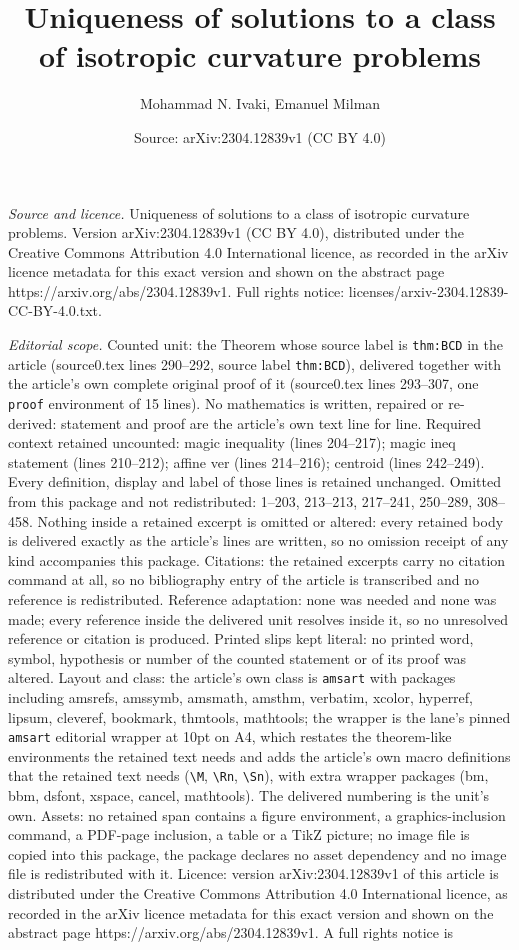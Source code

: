 \documentclass[10pt,a4paper]{amsart}
\title[Uniqueness of solutions to a class of isotropic curvature pr]{Uniqueness of solutions to a class of isotropic curvature problems}
\author{Mohammad N. Ivaki, Emanuel Milman}
\date{Source: arXiv:2304.12839v1 (CC BY 4.0)}
\begin{document}
\maketitle

\noindent\emph{Source and licence.} Uniqueness of solutions to a class of isotropic curvature problems. Version arXiv:2304.12839v1 (CC BY 4.0), distributed under the Creative Commons Attribution 4.0 International licence, as recorded in the arXiv licence metadata for this exact version and shown on the abstract page https://arxiv.org/abs/2304.12839v1. Full rights notice: licenses/arxiv-2304.12839-CC-BY-4.0.txt.\par\smallskip

\noindent\textit{Editorial scope.} Counted unit: the Theorem whose source label is \texttt{thm:BCD} in the article (source0.tex lines 290--292, source label \texttt{thm:BCD}), delivered together with the article's own complete original proof of it (source0.tex lines 293--307, one \texttt{proof} environment of 15 lines). No mathematics is written, repaired or re-derived: statement and proof are the article's own text line for line. Required context retained uncounted: magic inequality (lines 204--217); magic ineq statement (lines 210--212); affine ver (lines 214--216); centroid (lines 242--249). Every definition, display and label of those lines is retained unchanged. Omitted from this package and not redistributed: 1--203, 213--213, 217--241, 250--289, 308--458. Nothing inside a retained excerpt is omitted or altered: every retained body is delivered exactly as the article's lines are written, so no omission receipt of any kind accompanies this package. Citations: the retained excerpts carry no citation command at all, so no bibliography entry of the article is transcribed and no reference is redistributed. Reference adaptation: none was needed and none was made; every reference inside the delivered unit resolves inside it, so no unresolved reference or citation is produced. Printed slips kept literal: no printed word, symbol, hypothesis or number of the counted statement or of its proof was altered. Layout and class: the article's own class is \texttt{amsart} with packages including amsrefs, amssymb, amsmath, amsthm, verbatim, xcolor, hyperref, lipsum, cleveref, bookmark, thmtools, mathtools; the wrapper is the lane's pinned \texttt{amsart} editorial wrapper at 10pt on A4, which restates the theorem-like environments the retained text needs and adds the article's own macro definitions that the retained text needs (\texttt{\textbackslash M}, \texttt{\textbackslash Rn}, \texttt{\textbackslash Sn}), with extra wrapper packages (bm, bbm, dsfont, xspace, cancel, mathtools). The delivered numbering is the unit's own. Assets: no retained span contains a figure environment, a graphics-inclusion command, a PDF-page inclusion, a table or a TikZ picture; no image file is copied into this package, the package declares no asset dependency and no image file is redistributed with it. Licence: version arXiv:2304.12839v1 of this article is distributed under the Creative Commons Attribution 4.0 International licence, as recorded in the arXiv licence metadata for this exact version and shown on the abstract page https://arxiv.org/abs/2304.12839v1. A full rights notice is 
\end{document}
